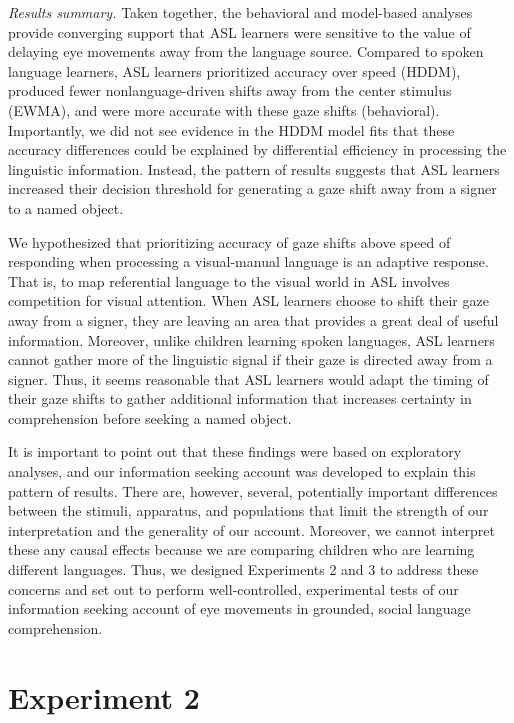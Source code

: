 \documentclass[english,floatsintext,man]{apa6}
\begin{document}
\emph{Results summary.} Taken together, the behavioral and model-based
analyses provide converging support that ASL learners were sensitive to
the value of delaying eye movements away from the language source.
Compared to spoken language learners, ASL learners prioritized accuracy
over speed (HDDM), produced fewer nonlanguage-driven shifts away from
the center stimulus (EWMA), and were more accurate with these gaze
shifts (behavioral). Importantly, we did not see evidence in the HDDM
model fits that these accuracy differences could be explained by
differential efficiency in processing the linguistic information.
Instead, the pattern of results suggests that ASL learners increased
their decision threshold for generating a gaze shift away from a signer
to a named object.

We hypothesized that prioritizing accuracy of gaze shifts above speed of
responding when processing a visual-manual language is an adaptive
response. That is, to map referential language to the visual world in
ASL involves competition for visual attention. When ASL learners choose
to shift their gaze away from a signer, they are leaving an area that
provides a great deal of useful information. Moreover, unlike children
learning spoken languages, ASL learners cannot gather more of the
linguistic signal if their gaze is directed away from a signer. Thus, it
seems reasonable that ASL learners would adapt the timing of their gaze
shifts to gather additional information that increases certainty in
comprehension before seeking a named object.

It is important to point out that these findings were based on
exploratory analyses, and our information seeking account was developed
to explain this pattern of results. There are, however, several,
potentially important differences between the stimuli, apparatus, and
populations that limit the strength of our interpretation and the
generality of our account. Moreover, we cannot interpret these any
causal effects because we are comparing children who are learning
different languages. Thus, we designed Experiments 2 and 3 to address
these concerns and set out to perform well-controlled, experimental
tests of our information seeking account of eye movements in grounded,
social language comprehension.

\hypertarget{experiment-2}{%
\section{Experiment 2}\label{experiment-2}}
\end{document}
